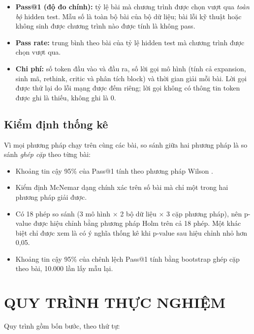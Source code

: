 \begin{itemize}
  \item \textbf{Pass@1 (độ đo chính):} tỷ lệ bài mà chương trình được chọn vượt qua \emph{toàn bộ} hidden test. Mẫu số là toàn bộ bài của bộ dữ liệu; bài lỗi kỹ thuật hoặc không sinh được chương trình nào được tính là không pass.
  \item \textbf{Pass rate:} trung bình theo bài của tỷ lệ hidden test mà chương trình được chọn vượt qua.
  \item \textbf{Chi phí:} số token đầu vào và đầu ra, số lời gọi mô hình (tính cả expansion, sinh mã, rethink, critic và phân tích block) và thời gian giải mỗi bài. Lời gọi được thử lại do lỗi mạng được đếm riêng; lời gọi không có thông tin token được ghi là thiếu, không ghi là 0.
\end{itemize}

\subsection{Kiểm định thống kê}

Vì mọi phương pháp chạy trên cùng các bài, so sánh giữa hai phương pháp là so sánh \emph{ghép cặp} theo từng bài:

\begin{itemize}
  \item Khoảng tin cậy 95\% của Pass@1 tính theo phương pháp Wilson \cite{wilson1927}.
  \item Kiểm định McNemar dạng chính xác \cite{mcnemar1947} trên số bài mà chỉ một trong hai phương pháp giải được.
  \item Có 18 phép so sánh (3 mô hình $\times$ 2 bộ dữ liệu $\times$ 3 cặp phương pháp), nên p-value được hiệu chỉnh bằng phương pháp Holm \cite{holm1979} trên cả 18 phép. Một khác biệt chỉ được xem là có ý nghĩa thống kê khi p-value sau hiệu chỉnh nhỏ hơn 0,05.
  \item Khoảng tin cậy 95\% của chênh lệch Pass@1 tính bằng bootstrap ghép cặp theo bài, 10.000 lần lấy mẫu lại.
\end{itemize}

\section{QUY TRÌNH THỰC NGHIỆM}
\label{sec:quytrinh}

Quy trình gồm bốn bước, theo thứ tự:

